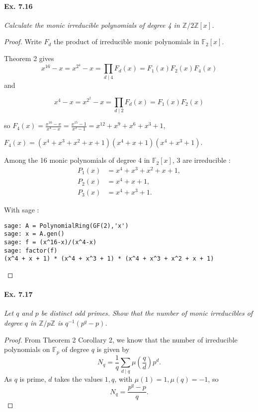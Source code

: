 \documentclass[11pt,a4paper]{article}
\newcommand{\Z}{\mathbb{Z}}
\newcommand{\F}{\mathbb{F}}
\begin{document}
\paragraph{Ex. 7.16}

{\it Calculate the monic irreducible polynomials of degree 4 in $\Z/2\Z[x]$.

}

\begin{proof}
Write $F_d$ the product of irreducible monic polynomials in $\mathbb{F}_2[x]$.

Theorem 2 gives $$x^{16}-x=x^{2^4}-x = \prod\limits_{d\mid 4} F_d(x) = F_1(x) F_2(x) F_4(x)$$ 
and 

$$x^{4}-x=x^{2^2}-x = \prod\limits_{d\mid 2} F_d(x) = F_1(x) F_2(x)$$

so $F_4(x) = \frac{x^{16}-x}{x^4-x} = \frac{x^{15}-1}{x^3-1} = x^{12}+x^9+x^6+x^3+1$,

$F_4(x) = (x^4+x^3+x^2+x+1)(x^4+x+1)(x^4+x^3+1)$.

Among the 16 monic polynomials of degree 4 in $\mathbb{F}_2[x]$, 3 are irreducible :
\begin{align*}
P_1(x) &= x^4+x^3+x^2+x+1,\\
 P_2(x)&=x^4+x+1,\\
  P_3(x)&=x^4+x^3+1.
\end{align*}

With sage : 
\begin{verbatim}
sage: A = PolynomialRing(GF(2),'x')
sage: x = A.gen()
sage: f = (x^16-x)/(x^4-x)
sage: factor(f)
(x^4 + x + 1) * (x^4 + x^3 + 1) * (x^4 + x^3 + x^2 + x + 1)
\end{verbatim}
\end{proof}

\paragraph{Ex. 7.17}

{\it Let $q$ and $p$ be distinct odd primes. Show that the number of monic irreducibles of degree $q$ in $\Z/p\Z$ is $q^{-1}(p^q -p)$.
}

\begin{proof}
From Theorem 2 Corollary 2, we know that the number of irreducible polynomials on $\F_p$ of degree $q$ is given by
$$N_q = \frac{1}{q}\sum_{d\mid q} \mu\left(\frac{q}{d}\right) p^d.$$
As $q$ is prime, $d$ takes the values $1,q$, with $\mu(1) = 1, \mu(q) = -1$, so
$$N_q = \frac{p^q -p}{q}.$$
\end{proof}
\end{document}
